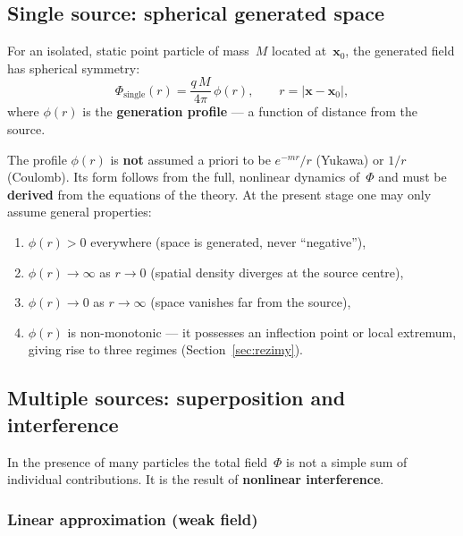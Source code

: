 \subsection{Single source: spherical generated space}%
\label{ssec:pojedyncze}

For an isolated, static point particle of mass~$M$ located
at~$\mathbf{x}_0$, the generated field has spherical symmetry:
\begin{equation}\label{eq:Phi-single}
    \Phi_{\mathrm{single}}(r)
    = \frac{q\,M}{4\pi}\,\phi(r),
    \qquad
    r = |\mathbf{x} - \mathbf{x}_0|,
\end{equation}
where $\phi(r)$ is the \textbf{generation profile} --- a function of
distance from the source.

The profile $\phi(r)$ is \textbf{not} assumed a priori to be
$e^{-mr}/r$ (Yukawa) or $1/r$ (Coulomb).  Its form follows from the
full, nonlinear dynamics of~$\Phi$ and must be \textbf{derived} from
the equations of the theory.  At the present stage one may only
assume general properties:
\begin{enumerate}[nosep]
  \item $\phi(r) > 0$ everywhere (space is generated, never
        ``negative''),
  \item $\phi(r) \to \infty$ as $r \to 0$ (spatial density diverges
        at the source centre),
  \item $\phi(r) \to 0$ as $r \to \infty$ (space vanishes far from
        the source),
  \item $\phi(r)$ is non-monotonic --- it possesses an inflection
        point or local extremum, giving rise to three regimes
        (Section~\ref{sec:rezimy}).
\end{enumerate}

\subsection{Multiple sources: superposition and interference}%
\label{ssec:interferencja}

In the presence of many particles the total field~$\Phi$ is not a
simple sum of individual contributions.  It is the result of
\textbf{nonlinear interference}.

\subsubsection{Linear approximation (weak field)}

